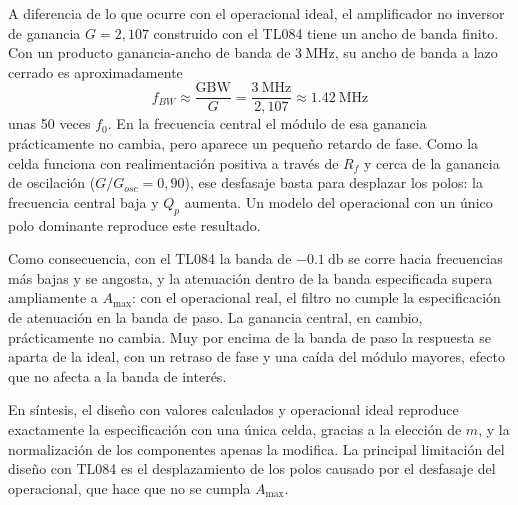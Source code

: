 A diferencia de lo que ocurre con el operacional ideal, el amplificador no inversor de ganancia $G = 2{,}107$
construido con el TL084 tiene un ancho de banda finito. Con un producto ganancia-ancho de banda de
$\SI{3}{\mega\hertz}$, su ancho de banda a lazo cerrado es aproximadamente
\begin{equation}
  f_{BW} \approx \frac{\text{GBW}}{G} = \frac{\SI{3}{\mega\hertz}}{2{,}107} \approx \SI{1.42}{\mega\hertz}
\end{equation}
unas 50 veces $f_0$. En la frecuencia central el módulo de esa ganancia prácticamente no cambia, pero aparece un
pequeño retardo de fase. Como la celda funciona con realimentación positiva a través de $R_f$ y cerca de la ganancia
de oscilación ($G / G_{osc} = 0{,}90$), ese desfasaje basta para desplazar los polos: la frecuencia central baja y
$Q_p$ aumenta. Un modelo del operacional con un único polo dominante reproduce este resultado.

Como consecuencia, con el TL084 la banda de $\SI{-0.1}{\decibel}$ se corre hacia frecuencias más bajas y se angosta, y
la atenuación dentro de la banda especificada supera ampliamente a $A_{\max}$: con el operacional real, el filtro no
cumple la especificación de atenuación en la banda de paso. La ganancia central, en cambio, prácticamente no cambia.
Muy por encima de la banda de paso la respuesta se aparta de la ideal, con un retraso de fase y una caída del módulo
mayores, efecto que no afecta a la banda de interés.

En síntesis, el diseño con valores calculados y operacional ideal reproduce exactamente la especificación con una
única celda, gracias a la elección de $m$, y la normalización de los componentes apenas la modifica. La principal
limitación del diseño con TL084 es el desplazamiento de los polos causado por el desfasaje del operacional, que hace
que no se cumpla $A_{\max}$.
